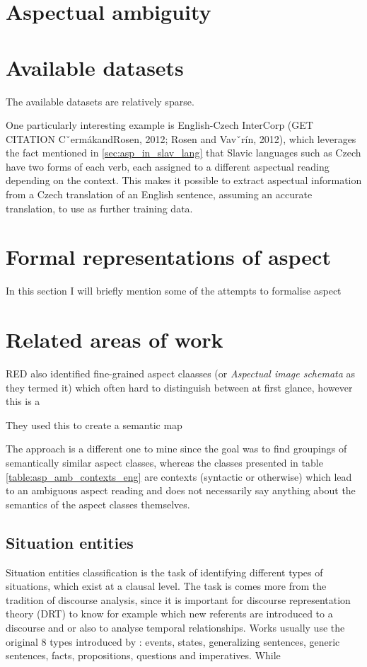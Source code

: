 \section{Aspectual ambiguity}

\section{Available datasets}
The available datasets are relatively sparse. 


One particularly interesting example is English-Czech InterCorp (GET CITATION CˇermákandRosen, 2012; Rosen and Vavˇrín, 2012), which leverages the fact mentioned in \ref{sec:asp_in_slav_lang} that Slavic languages such as Czech have two forms of each verb, each assigned to a different aspectual reading depending on the context. This makes it possible to extract aspectual information from a Czech translation of an English sentence, assuming an accurate translation, to use as further training data.

\section{Formal representations of aspect}
In this section I will briefly mention some of the attempts to formalise aspect
\section{Related areas of work}
RED also identified fine-grained aspect claasses (or \emph{Aspectual image schemata} as they termed it) which often hard to distinguish between at first glance, however this is a 

They used this to create a semantic map

The approach is a different one to mine since the goal was to find groupings of semantically similar aspect classes, whereas the classes presented in table \ref{table:asp_amb_contexts_eng} are contexts (syntactic or otherwise) which lead to an ambiguous aspect reading and does not necessarily say anything about the semantics of the aspect classes themselves.

\subsection{Situation entities}
Situation entities classification is the task of identifying different types of situations, which exist at a clausal level. The task is comes more from the tradition of discourse analysis, since it is important for discourse representation theory (DRT) to know for example which new referents are introduced to a discourse and or also to analyse temporal relationships. Works usually use the original 8 types introduced by \citet{Smith_2003}: events, states, generalizing sentences, generic sentences, facts, propositions, questions and imperatives. While 